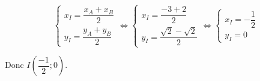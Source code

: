 \documentclass[a4paper]{article}
\begin{document}
    \begin{exercice}{}{}
        $$
        \left\{
            \begin{array}{ll}
                x_I=\dfrac{x_A+x_B}{2} \\
                y_I=\dfrac{y_A+y_B}{2}
            \end{array}
        \right.\iff
        \left\{
            \begin{array}{ll}
                x_I=\dfrac{-3+2}{2} \\
                y_I=\dfrac{\sqrt{2}-\sqrt{2}}{2}
            \end{array}
        \right.\iff
        \left\{
            \begin{array}{ll}
                x_I=-\dfrac{1}{2} \\
                y_I=0
            \end{array}
        \right.
        $$

        Donc $I\left(\dfrac{-1}{2};0\right)$.
        
    \end{exercice}
    
\end{document}
